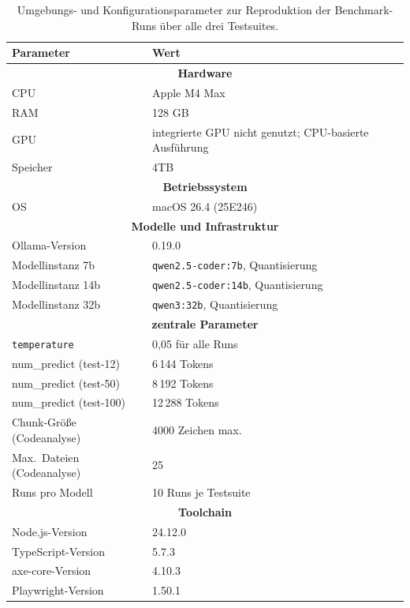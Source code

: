 \begin{table}[H]
\centering
\setlength{\tabcolsep}{5pt}
\renewcommand{\arraystretch}{1.4}
\caption[Umgebungs- und Konfigurationsparameter]{Umgebungs- und Konfigurationsparameter zur Reproduktion der Benchmark-Runs über alle drei Testsuites.}
\begin{tabular}{|p{5cm}|p{10cm}|}
\hline
\textbf{Parameter} & \textbf{Wert} \\
\hline
\multicolumn{2}{|c|}{\textbf{Hardware}} \\
\hline
\ac{CPU} & Apple M4 Max \\
\hline
\ac{RAM} & 128 GB \\
\hline
\ac{GPU} & integrierte \ac{GPU} nicht genutzt; \ac{CPU}-basierte Ausführung\\
\hline
Speicher & 4TB \\
\hline
\multicolumn{2}{|c|}{\textbf{Betriebssystem}} \\
\hline
OS & macOS 26.4 (25E246) \\
\hline
\multicolumn{2}{|c|}{\textbf{Modelle und Infrastruktur}} \\
\hline
Ollama-Version & 0.19.0 \\
\hline
Modellinstanz 7b & \texttt{qwen2.5-coder:7b}, Quantisierung \\
\hline
Modellinstanz 14b & \texttt{qwen2.5-coder:14b}, Quantisierung \\
\hline
Modellinstanz 32b & \texttt{qwen3:32b}, Quantisierung \\
\hline
\multicolumn{2}{|c|}{\textbf{zentrale Parameter}} \\
\hline
\texttt{temperature} & 0,05 für alle Runs \\
\hline
num\_predict (test-12) & 6\,144 Tokens \\
\hline
num\_predict (test-50) & 8\,192 Tokens \\
\hline
num\_predict (test-100) & 12\,288 Tokens \\
\hline
Chunk-Größe (Codeanalyse) & 4000 Zeichen max. \\
\hline
Max.\ Dateien (Codeanalyse) & 25 \\
\hline
Runs pro Modell & 10 Runs je Testsuite \\
\hline
\multicolumn{2}{|c|}{\textbf{Toolchain}} \\
\hline
Node.js-Version & 24.12.0 \\
\hline
TypeScript-Version & 5.7.3 \\
\hline
axe-core-Version & 4.10.3 \\
\hline
Playwright-Version & 1.50.1 \\
\hline
\end{tabular}
\label{tab:reproducibility}
\end{table}

